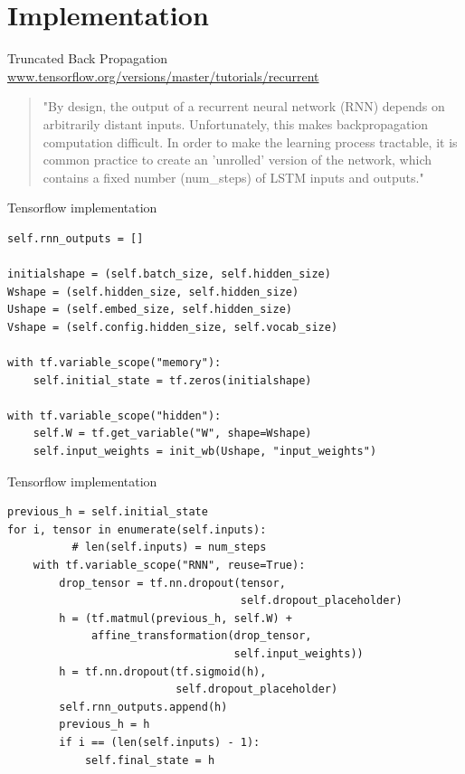 \documentclass[10pt]{beamer}
\begin{document}
\section{Implementation}

\begin{frame}{Truncated Back Propagation}
\url{www.tensorflow.org/versions/master/tutorials/recurrent}
\begin{quote}
"By design, the output of a recurrent neural network (RNN) depends on arbitrarily distant inputs. Unfortunately, this makes backpropagation computation difficult. In order to make the learning process tractable, \alert{it is common practice to create an 'unrolled' version of the network, which contains a fixed number (num\_steps) of LSTM inputs and outputs}."
\end{quote}
\end{frame}

\begin{frame}[fragile]{Tensorflow implementation}
\begin{verbatim}
self.rnn_outputs = []

initialshape = (self.batch_size, self.hidden_size)
Wshape = (self.hidden_size, self.hidden_size)
Ushape = (self.embed_size, self.hidden_size)
Vshape = (self.config.hidden_size, self.vocab_size)

with tf.variable_scope("memory"):
    self.initial_state = tf.zeros(initialshape)

with tf.variable_scope("hidden"):
    self.W = tf.get_variable("W", shape=Wshape)
    self.input_weights = init_wb(Ushape, "input_weights")
\end{verbatim}
\end{frame}

\begin{frame}[fragile]{Tensorflow implementation}
\begin{verbatim}
previous_h = self.initial_state
for i, tensor in enumerate(self.inputs):
          # len(self.inputs) = num_steps
    with tf.variable_scope("RNN", reuse=True):
        drop_tensor = tf.nn.dropout(tensor,
                                    self.dropout_placeholder)
        h = (tf.matmul(previous_h, self.W) +
             affine_transformation(drop_tensor,
                                   self.input_weights))
        h = tf.nn.dropout(tf.sigmoid(h),
                          self.dropout_placeholder)
        self.rnn_outputs.append(h)
        previous_h = h
        if i == (len(self.inputs) - 1):
            self.final_state = h
\end{verbatim}
\end{frame}
\end{document}
